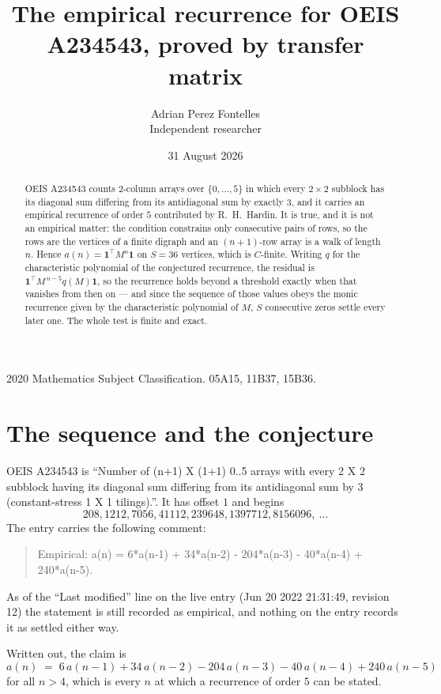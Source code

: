 \documentclass[11pt,a4paper]{article}
\title{The empirical recurrence for OEIS A234543, proved by transfer matrix}
\author{Adrian Perez Fontelles\\ \small Independent researcher}
\date{31 August 2026}
\theoremstyle{plain}
\theoremstyle{definition}
\begin{document}
\maketitle

\begin{abstract}
OEIS A234543 counts $2$-column arrays over $\{0,\dots,5\}$ in which every
$2\times2$ subblock has its diagonal sum differing from its antidiagonal sum by
exactly $3$, and it
carries an empirical recurrence of order $5$ contributed by R.~H.~Hardin. It is true,
and it is not an empirical matter: the condition constrains only consecutive pairs of rows,
so the rows are the vertices of a finite digraph and an $(n+1)$-row array is a walk of
length $n$. Hence $a(n)=\mathbf{1}^{\!\top}M^{n}\mathbf{1}$ on $S=36$ vertices, which
is $C$-finite. Writing $q$ for the characteristic polynomial of the conjectured recurrence,
the residual is $\mathbf{1}^{\!\top}M^{\,n-5}q(M)\mathbf{1}$, so the recurrence
holds beyond a threshold exactly when that vanishes from then on --- and since the sequence
of those values obeys the monic recurrence given by the characteristic polynomial of $M$,
$S$ consecutive zeros settle every later one. The whole test is finite and exact.
\end{abstract}

\noindent\small 2020 Mathematics Subject Classification. 05A15, 11B37, 15B36.\normalsize

\section{The sequence and the conjecture}

OEIS A234543 is ``Number of (n+1) X (1+1) 0..5 arrays with every 2 X 2 subblock having its diagonal sum differing from its antidiagonal sum by 3 (constant-stress 1 X 1 tilings).''. It has offset
$1$ and begins
\[
208, 1212, 7056, 41112, 239648, 1397712, 8156096,\ \dots
\]
The entry carries the following comment:
\begin{quote}\small
Empirical: a(n) = 6*a(n-1) + 34*a(n-2) - 204*a(n-3) - 40*a(n-4) + 240*a(n-5).
\end{quote}
As of the ``Last modified'' line on the live entry (Jun 20 2022 21:31:49, revision 12) the statement is
still recorded as empirical, and nothing on the entry records it as settled either way.

Written out, the claim is
\begin{equation}\label{eq:conj}
a(n)\;=\;6\,a(n-1) + 34\,a(n-2) - 204\,a(n-3) - 40\,a(n-4) + 240\,a(n-5)
\end{equation}
for all $n>4$, which is every $n$ at which a recurrence of order $5$ can be
stated.
\end{document}

